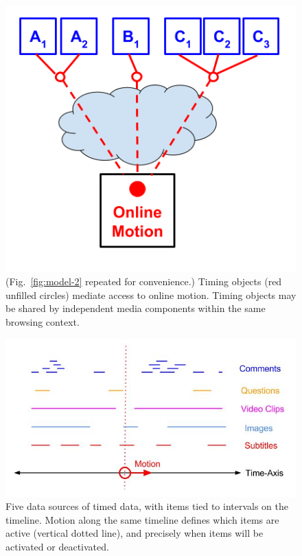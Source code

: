 \documentclass[graybox]{svmult}
\begin{document}
\begin{figure}[h]
\centering
\includegraphics[scale=.3]{fig/motion-model-2.png}
\caption{(Fig.~\ref{fig:model-2} repeated for convenience.) Timing objects (red unfilled circles) mediate access to online motion. Timing objects may be shared by independent media components within the same browsing context.}
\label{fig:model-repeat}
\end{figure}

\begin{figure}[h]
\centering
\includegraphics[scale=.4]{fig/sequencer.jpg}
\caption{Five data sources of timed data, with items tied to intervals on the timeline. Motion along the same timeline defines which items are active (vertical dotted line), and precisely when items will be activated or deactivated.}
\label{fig:sequencer}
\end{figure}
\end{document}
